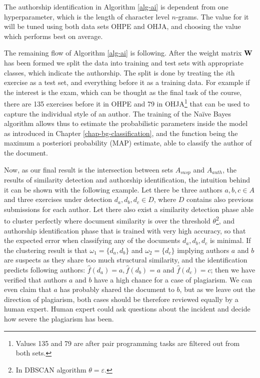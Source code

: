 \noindent
The authorship identification in Algorithm \ref{alg-ai} is dependent from one hyperparameter, which is the length of character level $n$-grams. The value for it will be tuned using both data sets OHPE and OHJA, and choosing the value which performs best on average. 

The remaining flow of Algorithm \ref{alg-ai} is following. After the weight matrix $\mathbf{W}$ has been formed we split the data into training and test sets with appropriate classes, which indicate the authorship. The split is done by treating the $i$th exercise as a test set, and everything before it as a training data. For example if the interest is the exam, which can be thought as the final task of the course, there are 135 exercises before it in OHPE and 79 in OHJA\footnote{Values 135 and 79 are after pair programming tasks are filtered out from both sets.} that can be used to capture the individual style of an author. The training of the Naïve Bayes algorithm allows thus to estimate the probabilistic parameters inside the model as introduced in Chapter \ref{chap-bg-classification}, and the function  being the maximum a posteriori probability (MAP) estimate, able to classify the author of the document. 


Now, as our final result is the intersection between sets $A_{susp}$ and $A_{auth}$, the results of similarity detection and authorship identification, the intuition behind it can be shown with the following example. Let there be three authors $a,b,c \in A$ and three exercises under detection $d_a, d_b, d_c \in D$, where $D$ contains also previous submissions for each author. Let there also exist a similarity detection phase able to cluster perfectly where document similarity is over the threshold $\theta$\footnote{In DBSCAN algorithm $\theta = \varepsilon$.}, and authorship identification phase that is trained with very high accuracy, so that the expected error when classifying any of the documents $d_a, d_b, d_c$ is minimal. If the clustering result is that $\omega_1 = \{d_a,d_b\}$ and $\omega_2 = \{d_c\}$ implying authors $a$ and $b$ are suspects as they share too much structural similarity, and the identification predicts following authors: $\hat{f}(d_a) = a, \hat{f}(d_b) = a$ and $\hat{f}(d_c) = c$; then we have verified that authors $a$ and $b$ have a high chance for a case of plagiarism. We can even claim that $a$ has probably shared the document to $b$, but as we leave out the direction of plagiarism, both cases should be therefore reviewed equally by a human expert. Human expert could ask questions about the incident and decide how severe the plagiarism has been. 

